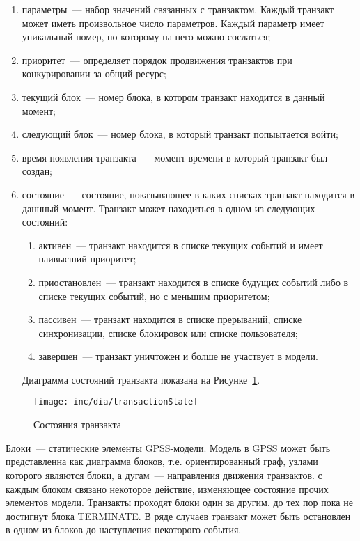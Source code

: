 \begin{enumerate}
\item параметры~--- набор значений связанных с транзактом. Каждый транзакт может иметь произвольное число параметров. Каждый параметр имеет уникальный номер, по которому на него можно сослаться;
\item приоритет~--- определяет порядок продвижения транзактов при конкурировании за общий ресурс;
\item текущий блок~--- номер блока, в котором транзакт находится в данный момент;
\item следующий блок~--- номер блока, в который транзакт попыытается войти;
\item время появления транзакта~---  момент времени в который транзакт был создан;
\item состояние~--- состояние, показывающее в каких списках транзакт находится в даннный момент. Транзакт может находиться в одном из следующих состояний:
    \begin{enumerate}
    \item активен~--- транзакт находится в списке текущих событий и имеет наивысший приоритет;
    \item приостановлен~--- транзакт находится в списке будущих событий либо в списке текущих событий, но с меньшим приоритетом;
    \item пассивен~--- транзакт находится в списке прерываний, списке синхронизации, списке блокировок или списке пользователя;
    \item завершен~--- транзакт уничтожен и болше не участвует в модели.
    \end{enumerate}
    Диаграмма состояний транзакта показана на Рисунке~\ref{fig:transactionState}.
\end{enumerate}


\begin{figure}[ht]
  \centering
  \texttt{[image: inc/dia/transactionState]}
  \caption{Состояния транзакта}
  \label{fig:transactionState}
\end{figure}


Блоки~--- статические элементы GPSS-модели. Модель в GPSS может быть представленна как диаграмма блоков, т.е. ориентированный граф, узлами которого являются блоки, а дугам~--- направления движения транзактов. с каждым блоком связано некоторое действие, изменяющее состояние прочих элементов модели. Транзакты проходят блоки один за другим, до тех пор пока не достигнут блока TERMINATE. В ряде случаев транзакт может быть остановлен в одном из блоков до наступления некоторого события.


